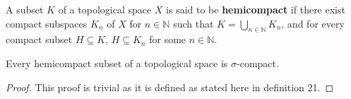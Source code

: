 \documentclass{article}
\begin{document}
	\begin{definition}
	  A subset \(K\) of a topological space \(X\) is said to be \textbf{hemicompact} if
	  there exist compact subspaces \(K_n\) of \(X\) for \(n\in\mathbb N\) such that
	  \(K=\bigcup_{n\in\mathbb N} K_n\), and for every compact subset \(H\subseteq K\),
	  \(H\subseteq K_n\) for some \(n\in\mathbb N\).
	\end{definition}

	\begin{theorem}
		Every hemicompact subset of a topological space is \(\sigma\)-compact.
	\end{theorem}
	\begin{proof}
		This proof is trivial as it is defined as stated here in definition 21.
	\end{proof}
\end{document}
